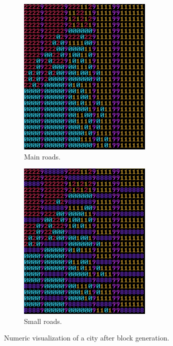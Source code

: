 	\begin{figure}[h]
		\begin{subfigure}{0.5\textwidth}
			\centering
			\includegraphics[width=0.8\linewidth]{"Images/map main roads colored"}
			\caption{Main roads.}
			\label{fig:map-main-roads}
		\end{subfigure}
		\begin{subfigure}{0.5\textwidth}
			\centering
			\includegraphics[width=0.8\linewidth]{"Images/map small roads colored"}
			\caption{Small roads.}
			\label{fig:map-small-roads}
		\end{subfigure}
		\caption{Numeric visualization of a city after block generation.}
		\label{fig:map-main-and-small-roads}
	\end{figure}
		
